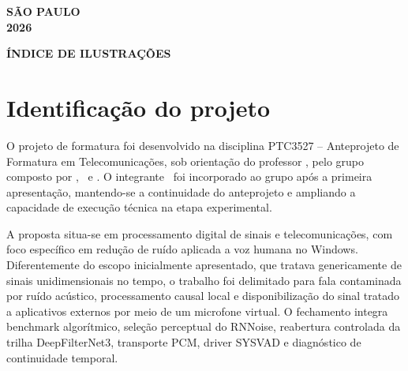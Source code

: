 \vfill

{\centering
\textbf{SÃO PAULO}\\
\textbf{2026}
\par}

\clearpage
\restoregeometry

\tableofcontents
\clearpage

\thispagestyle{empty}
{\centering
\Large
\textbf{ÍNDICE DE ILUSTRAÇÕES}
\par}

{%
\renewcommand{\numberline}[1]{\makebox[\cftfignumwidth][l]{Figura~#1}}%
\renewcommand{\listfigurename}{\large Figuras}
\listoffigures%
}

{%
\renewcommand{\numberline}[1]{\makebox[\cfttabnumwidth][l]{Tabela~#1}}%
\renewcommand{\listtablename}{\large Tabelas}
\listoftables%
}

{%
\renewcommand{\numberline}[1]{\makebox[\mygraficolabelwd][l]{Gráfico~#1}}%
\renewcommand{\listgraficoname}{\large Gráficos}
\listofgrafico%
}

{%
\renewcommand{\numberline}[1]{\makebox[\mycodigolabelwd][l]{Código~#1}}%
\renewcommand{\listcodigoname}{\large Códigos}
\listofcodigo%
}

\clearpage

\section{Identificação do projeto}

O projeto de formatura \textit{\tituloProjeto} foi desenvolvido na disciplina PTC3527 -- Anteprojeto de Formatura em Telecomunicações, sob orientação do professor \orientadorProjeto, pelo grupo composto por \alunoA, \alunoB\ e \alunoC. O integrante \alunoC\ foi incorporado ao grupo após a primeira apresentação, mantendo-se a continuidade do anteprojeto e ampliando a capacidade de execução técnica na etapa experimental.

A proposta situa-se em processamento digital de sinais e telecomunicações, com foco específico em redução de ruído aplicada a voz humana no Windows. Diferentemente do escopo inicialmente apresentado, que tratava genericamente de sinais unidimensionais no tempo, o trabalho foi delimitado para fala contaminada por ruído acústico, processamento causal local e disponibilização do sinal tratado a aplicativos externos por meio de um microfone virtual. O fechamento integra benchmark algorítmico, seleção perceptual do RNNoise, reabertura controlada da trilha DeepFilterNet3, transporte PCM, driver SYSVAD e diagnóstico de continuidade temporal.

